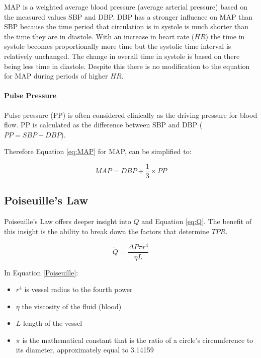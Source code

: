 MAP is a weighted average blood pressure (average arterial pressure) based on the measured values SBP and DBP. DBP has a stronger influence on MAP than SBP because the time period that circulation is in systole is much shorter than the time they are in diastole. With an increase in heart rate ($HR$) the time in systole becomes proportionally more time but the systolic time interval is relatively unchanged. The change in overall time in systole is based on there being less time in diastole. Despite this there is no modification to the equation for MAP during periods of higher $HR$.

\paragraph{Pulse Pressure}

Pulse pressure (PP) is often considered clinically as the driving pressure for blood flow. PP is calculated as the difference between SBP and DBP ($PP = SBP - DBP$). 

Therefore Equation \ref{eq:MAP} for MAP, can be simplified to:

\begin{equation}
    MAP = DBP + \frac{1}{3} \times PP
    \label{eq:MAP_simplified}
\end{equation}

\subsection{Poiseuille's Law}

Poiseuille's Law offers deeper insight into $\dot{Q}$ and Equation \ref{eq:Q}. The benefit of this insight is the ability to break down the factors that determine $TPR$.

\begin{equation}
    \dot{Q} = \frac{\Delta P \pi r^4}{\eta L}
    \label{Poiseuille}
\end{equation}

In Equation \ref{Poiseuille}:
\begin{itemize}
    \item $r^4$ is vessel radius to the fourth power
    \item $\eta$ the viscosity of the fluid (blood)
    \item $L$ length of the vessel
    \item $\pi$ is the mathematical constant that is the ratio of a circle's circumference to its diameter, approximately equal to 3.14159
\end{itemize}

